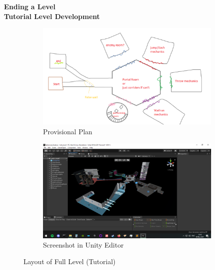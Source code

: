 \textbf{Ending a Level}\\


\textbf{Tutorial Level Development}\\



\begin{figure}[H]
\centering
\begin{subfigure}{0.5\textwidth}
  \centering
  \includegraphics[width=1\linewidth]{Figures/fullplan.png}
  \caption{Provisional Plan}
\end{subfigure}%
\begin{subfigure}{0.5\textwidth}
  \centering
  \includegraphics[width=1\linewidth]{Figures/full.png}
  \caption{Screenshot in Unity Editor}
\end{subfigure}
\caption{Layout of Full Level (Tutorial)}
\end{figure}

